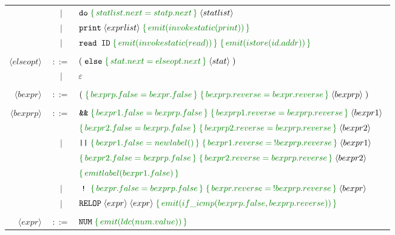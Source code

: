 \documentclass[a4paper]{article}
\newcommand{\cmd}[1]{\textcolor{MyGreen}{\{\, #1 \,\}} \;}
\newcommand{\node}[1]{\langle #1 \rangle \;}
\newcommand{\tag}[1]{\texttt{#1} \;}
\begin{document}
\begin{center}
\begin{tabular}{ r c l }
                      &  $|$  & $\tag{do} \cmd{statlist.next = statp.next} \node{statlist}$ \\

                      &  $|$  & $\tag{print} \node{exprlist} \cmd{emit(invokestatic(print))}$ \\

                      &  $|$  & $\texttt{read ID}\; \cmd{emit(invokestatic(read))} \cmd{emit(istore(id.addr))}$ \\\\
  $\node{elseopt}$    & $::=$ & $(\; \tag{else} \cmd{stat.next = elseopt.next} \node{stat})$ \\
                      &  $|$  & $\varepsilon$ \\\\
  $\node{bexpr}$      & $::=$ & $(\; \cmd{bexprp.false = bexpr.false} \cmd{bexprp.reverse = bexpr.reverse} \node{bexprp} )$ \\\\
  $\node{bexprp}$     & $::=$ & $\tag{\&\&} \cmd{bexpr1.false = bexprp.false} \cmd{bexprp1.reverse = bexprp.reverse} \node{bexpr1}$ \\
                      &       & $\cmd{bexpr2.false = bexprp.false} \cmd{bexprp2.reverse = bexprp.reverse} \node{bexpr2}$ \\
                      &  $|$  & $\tag{||} \cmd{bexpr1.false = newlabel()} \cmd{bexpr1.reverse =\:!bexprp.reverse} \node{bexpr1}$ \\
                      &       & $\cmd{bexpr2.false = bexprp.false} \cmd{bexpr2.reverse = bexprp.reverse} \node{bexpr2}$ \\
                      &       & $\cmd{emitlabel(bexpr1.false)}$ \\
                      &  $|$  & $\;\tag{!}\; \cmd{bexpr.false = bexprp.false} \cmd{bexpr.reverse =\:!bexprp.reverse} \node{bexpr}$ \\
                      &  $|$  & $\tag{RELOP} \node{expr} \node{expr} \cmd{emit(if\_icmp(bexprp.false, bexprp.reverse))}$ \\\\
  $\node{expr}$       & $::=$ & $\tag{NUM} \cmd{emit(ldc(num.value))}$ \\


\end{tabular}
\end{center}
\end{document}
